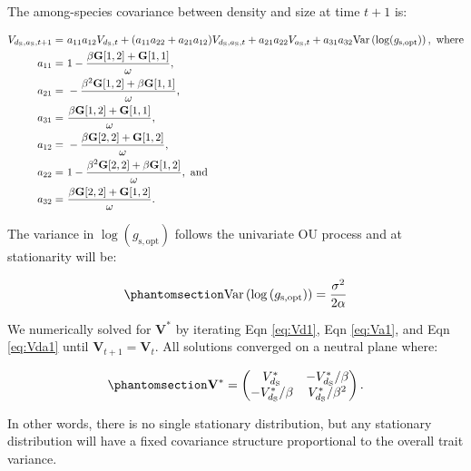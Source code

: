 \documentclass[
  letterpaper,
  DIV=11,
  numbers=noendperiod]{scrartcl}
\begin{document}
The among-species covariance between density and size at time \(t+1\)
is:

\begin{align}
\label{eq:Vda1}
V_{d_\mathrm{S},a_\mathrm{S},t + 1} =~ & a_{11} a_{12} V_{d_\mathrm{S},t} + (a_{11} a_{22} + a_{21} a_{12}) V_{d_\mathrm{S},a_\mathrm{S},t} + a_{21} a_{22} V_{a_\mathrm{S},t} + a_{31} a_{32} \text{Var} \left( \log (g_\mathrm{s,opt} ) \right),~\text{where} \\
a_{11} =~ & 1 - \frac{\beta \mathbf{G}[1, 2] + \mathbf{G}[1, 1]}{\omega}, \notag \\
a_{21} =~ & -\frac{\beta ^ 2 \mathbf{G}[1, 2] + \beta \mathbf{G}[1, 1]}{\omega}, \notag \\
a_{31} =~ & \frac{\beta \mathbf{G}[1, 2] + \mathbf{G}[1, 1]}{\omega}, \notag \\
a_{12} =~ & -\frac{\beta \mathbf{G}[2, 2] + \mathbf{G}[1, 2]}{\omega}, \notag \\
a_{22} =~ & 1 - \frac{\beta ^ 2 \mathbf{G}[2, 2] + \beta \mathbf{G}[1, 2]}{\omega},~\text{and} \notag \\
a_{32} =~ & \frac{\beta \mathbf{G}[2, 2] + \mathbf{G}[1, 2]}{\omega}. \notag
\end{align}

The variance in \(\log (g_\mathrm{s,opt})\) follows the univariate OU
process and at stationarity will be:

\begin{equation}\phantomsection\label{eq-Vgmax}{\text{Var} \left( \log \left( g_\mathrm{s,opt} \right) \right) = \frac{\sigma ^ 2}{2 \alpha}}\end{equation}

We numerically solved for \(\mathbf{V}^*\) by iterating Eqn
\ref{eq:Vd1}, Eqn \ref{eq:Va1}, and Eqn \ref{eq:Vda1} until
\(\mathbf{V}_{t+1} = \mathbf{V}_{t}\). All solutions converged on a
neutral plane where:

\begin{equation}\phantomsection\label{eq-Vstar1}{\mathbf{V}^* = \begin{pmatrix} V_{d_\mathrm{S}}^* & -V_{d_\mathrm{S}}^* / \beta \\ -V_{d_\mathrm{S}}^* / \beta & V_{d_\mathrm{S}}^* / \beta^2 \end{pmatrix}.}\end{equation}

In other words, there is no single stationary distribution, but any
stationary distribution will have a fixed covariance structure
proportional to the overall trait variance.
\end{document}
